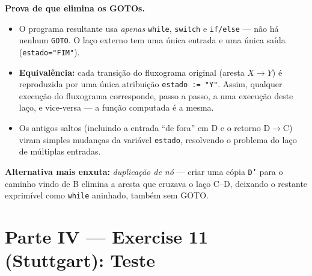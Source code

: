 \documentclass[11pt,a4paper]{article}
\begin{document}
\begin{resposta}
\textbf{Prova de que elimina os GOTOs.}
\begin{itemize}[nosep]
  \item O programa resultante usa \emph{apenas} \texttt{while}, \texttt{switch} e
        \texttt{if/else} — não há nenhum \texttt{GOTO}. O laço externo tem uma
        única entrada e uma única saída (\texttt{estado="FIM"}).
  \item \textbf{Equivalência:} cada transição do fluxograma original
        (aresta $X\to Y$) é reproduzida por uma única atribuição
        \texttt{estado := "Y"}. Assim, qualquer execução do fluxograma
        corresponde, passo a passo, a uma execução deste laço, e vice-versa —
        a função computada é a mesma.
  \item Os antigos saltos (incluindo a entrada “de fora” em D e o retorno
        D$\to$C) viram simples mudanças da variável \texttt{estado}, resolvendo o
        problema do laço de múltiplas entradas.
\end{itemize}
\textbf{Alternativa mais enxuta:} \emph{duplicação de nó} — criar uma cópia
\texttt{D'} para o caminho vindo de B elimina a aresta que cruzava o laço
C--D, deixando o restante exprimível como \texttt{while} aninhado, também sem
GOTO.
\end{resposta}

\section{Parte IV — Exercise 11 (Stuttgart): Teste}

\end{document}
